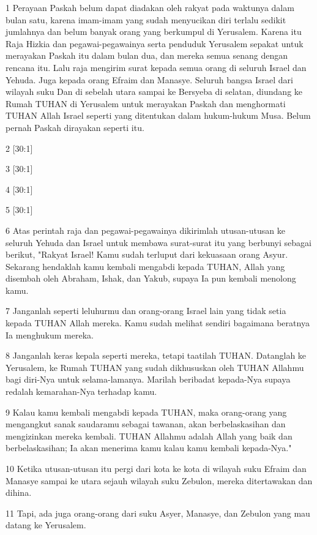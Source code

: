 \par 1 Perayaan Paskah belum dapat diadakan oleh rakyat pada waktunya dalam bulan satu, karena imam-imam yang sudah menyucikan diri terlalu sedikit jumlahnya dan belum banyak orang yang berkumpul di Yerusalem. Karena itu Raja Hizkia dan pegawai-pegawainya serta penduduk Yerusalem sepakat untuk merayakan Paskah itu dalam bulan dua, dan mereka semua senang dengan rencana itu. Lalu raja mengirim surat kepada semua orang di seluruh Israel dan Yehuda. Juga kepada orang Efraim dan Manasye. Seluruh bangsa Israel dari wilayah suku Dan di sebelah utara sampai ke Bersyeba di selatan, diundang ke Rumah TUHAN di Yerusalem untuk merayakan Paskah dan menghormati TUHAN Allah Israel seperti yang ditentukan dalam hukum-hukum Musa. Belum pernah Paskah dirayakan seperti itu.
\par 2 [30:1]
\par 3 [30:1]
\par 4 [30:1]
\par 5 [30:1]
\par 6 Atas perintah raja dan pegawai-pegawainya dikirimlah utusan-utusan ke seluruh Yehuda dan Israel untuk membawa surat-surat itu yang berbunyi sebagai berikut, "Rakyat Israel! Kamu sudah terluput dari kekuasaan orang Asyur. Sekarang hendaklah kamu kembali mengabdi kepada TUHAN, Allah yang disembah oleh Abraham, Ishak, dan Yakub, supaya Ia pun kembali menolong kamu.
\par 7 Janganlah seperti leluhurmu dan orang-orang Israel lain yang tidak setia kepada TUHAN Allah mereka. Kamu sudah melihat sendiri bagaimana beratnya Ia menghukum mereka.
\par 8 Janganlah keras kepala seperti mereka, tetapi taatilah TUHAN. Datanglah ke Yerusalem, ke Rumah TUHAN yang sudah dikhususkan oleh TUHAN Allahmu bagi diri-Nya untuk selama-lamanya. Marilah beribadat kepada-Nya supaya redalah kemarahan-Nya terhadap kamu.
\par 9 Kalau kamu kembali mengabdi kepada TUHAN, maka orang-orang yang mengangkut sanak saudaramu sebagai tawanan, akan berbelaskasihan dan mengizinkan mereka kembali. TUHAN Allahmu adalah Allah yang baik dan berbelaskasihan; Ia akan menerima kamu kalau kamu kembali kepada-Nya."
\par 10 Ketika utusan-utusan itu pergi dari kota ke kota di wilayah suku Efraim dan Manasye sampai ke utara sejauh wilayah suku Zebulon, mereka ditertawakan dan dihina.
\par 11 Tapi, ada juga orang-orang dari suku Asyer, Manasye, dan Zebulon yang mau datang ke Yerusalem.
